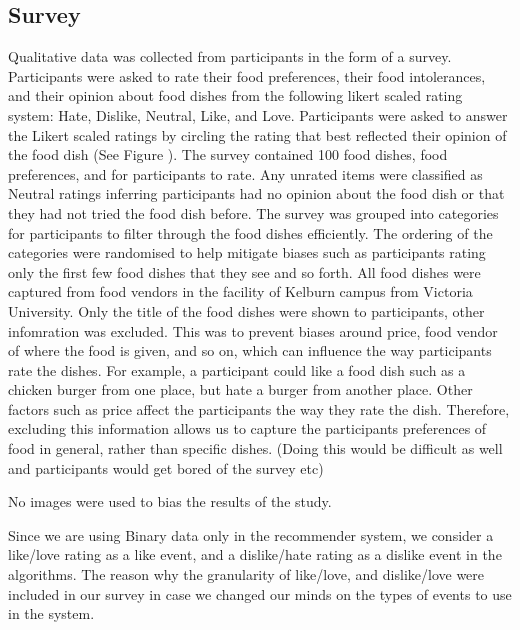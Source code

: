
\subsection{Survey}

Qualitative data was collected from participants in the form of a survey. Participants were asked to rate their food preferences, their food intolerances, and their opinion about food dishes from the following likert scaled rating system: Hate, Dislike, Neutral, Like, and Love. Participants were asked to answer the Likert scaled ratings by circling the rating that best reflected their opinion of the food dish (See Figure ). The survey contained 100 food dishes,  food preferences, and  for participants to rate. Any unrated items were classified as Neutral ratings inferring participants had no opinion about the food dish or that they had not tried the food dish before. The survey was grouped into categories for participants to filter through the food dishes efficiently. The ordering of the categories were randomised to help mitigate biases such as participants rating only the first few food dishes that they see and so forth. All food dishes were captured from food vendors in the facility of Kelburn campus from Victoria University. Only the title of the food dishes were shown to participants, other infomration was excluded. This was to prevent biases around price, food vendor of where the food is given, and so on, which can influence the way participants rate the dishes. For example, a participant could like a food dish such as a chicken burger from one place, but hate a burger from another place. Other factors such as price affect the participants the way they rate the dish. Therefore, excluding this information allows us to capture the participants preferences of food in general, rather than specific dishes.  (Doing this would be difficult as well and participants would get bored of the survey etc)

No images were used to bias the results of the study. 

Since we are using Binary data only in the recommender system, we consider a like/love rating as a like event, and a dislike/hate rating as a dislike event in the algorithms. The reason why the granularity of like/love, and dislike/love were included in our survey in case we changed our minds on the types of events to use in the system.

